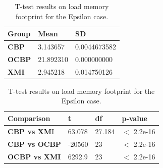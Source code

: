 \documentclass{llncs}
\begin{document}
    \begin{table}[ht]
        \centering
        \label{table:ttest_load_memory_epsilon}
        \caption{T-test results on load memory footprint for the Epsilon case.}
        \begin{minipage}{0.44\textwidth}
            \centering
            \begin{tabular}{|p{}|p{}|p{}|}
                \hline 
                \textbf{Group}  & \textbf{Mean} & \textbf{SD} \\ 
                \hline 
                \textbf{CBP} & 3.143657     &0.0044673582 \\ 
                \hline 
                \textbf{OCBP} & 21.892310  & 0.000000000 \\ 
                \hline 
                \textbf{XMI} & 2.945218   &0.014750126 \\ 
                \hline 
            \end{tabular} 
        \end{minipage}
        \hfill
        \begin{minipage}{0.54\textwidth}
            \centering
            \begin{tabular}{|p{}|p{}|p{}|p{}|}
                \hline 
                \textbf{Comparison} & \textbf{t}  & \textbf{df} & \textbf{p-value} \\ 
                \hline 
                \textbf{CBP vs XM}I &63.078  &27.184 & $<$ 2.2e-16 \\ 
                \hline 
                \textbf{CBP vs OCBP} & -20560 & 23 & $<$ 2.2e-16 \\ 
                \hline 
                \textbf{OCBP vs XMI} & 6292.9   &23   & $<$ 2.2e-16 \\ 
                \hline 
            \end{tabular} 
        \end{minipage}
    \end{table}
    
\end{document}
